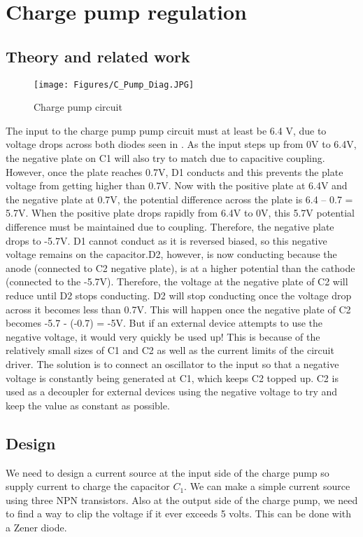 \chapter{Charge pump regulation}
\section{Theory and related work} \label{sec:literature_chargepump}

\begin{figure}[h]
    \centering
    \texttt{[image: Figures/C\_Pump\_Diag.JPG]}
    \caption{Charge pump circuit}
    \label{fig:C_pump_theorydiag}
\end{figure}

The input to the charge pump pump circuit must at least be 6.4 V, due to voltage drops across both diodes seen in . As the input steps up from 0V to 6.4V, the negative plate on C1 will also try to match due to capacitive coupling. However, once the plate reaches 0.7V, D1 conducts and this prevents the plate voltage from getting higher than 0.7V. Now with the positive plate at 6.4V and the negative plate at 0.7V, the potential difference across the plate is 6.4 – 0.7 = 5.7V. When the positive plate drops rapidly from 6.4V to 0V, this 5.7V potential difference must be maintained due to coupling. Therefore, the negative plate drops to -5.7V. D1 cannot conduct as it is reversed biased, so this negative voltage remains on the capacitor.D2, however, is now conducting because the anode (connected to C2 negative plate), is at a higher potential than the cathode (connected to the -5.7V). Therefore, the voltage at the negative plate of C2 will reduce until D2 stops conducting. D2 will stop conducting once the voltage drop across it becomes less than 0.7V. This will happen once the negative plate of C2 becomes -5.7 - (-0.7) = -5V. \cite{C_Pump_Site}
But if an external device attempts to use the negative voltage, it would very quickly be used up! This is because of the relatively small sizes of C1 and C2 as well as the current limits of the circuit driver. The solution is to connect an oscillator to the input so that a negative voltage is constantly being generated at C1, which keeps C2 topped up.
C2 is used as a decoupler for external devices using the negative voltage to try and keep the value as constant as possible.\cite{C_Pump_Site}

\section{Design} \label{sec:design_chargepump}
We need to design a current source at the input side of the charge pump so supply current to charge the capacitor $C_1$. 
We can make a simple current source using three NPN transistors.
Also at the output side of the charge pump, we need to find a way to clip the voltage if it ever exceeds 5 volts. This can be done with a Zener diode.

